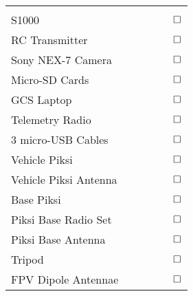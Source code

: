 \documentclass[12pt]{article}
\begin{document}
\begin{longtable}{|>{\raggedright}m{3cm}| m{2cm}| m{2cm}| m{2cm}|m{2cm}|c}
		\multicolumn{6}{c}{ }\\ \cline{1-1}
		S1000                                                                                      & \multicolumn{4}{c}{ }  & $\huge \square$ \\   \cline{1-1}
		RC Transmitter                                                                             & \multicolumn{4}{c}{ }  & $\huge \square$ \\   \cline{1-1}
		Sony NEX-7 Camera                                                                          & \multicolumn{4}{c}{ } & $\huge \square$ \\   \cline{1-1}
		Micro-SD Cards                                                                             & \multicolumn{4}{c}{ } & $\huge \square$ \\   \cline{1-1}
		GCS Laptop                                                                                 &\multicolumn{4}{c}{ } & $\huge \square$ \\   \cline{1-1}
		Telemetry Radio                                                                            & \multicolumn{4}{c}{ } & $\huge \square$ \\   \cline{1-1}
		3 micro-USB Cables                                                                         &\multicolumn{4}{c}{ }  & $\huge \square$ \\   \cline{1-1}
		Vehicle Piksi                                                                              & \multicolumn{4}{c}{ } & $\huge \square$ \\   \cline{1-1}
		Vehicle Piksi Antenna                                                                      &\multicolumn{4}{c}{ } & $\huge \square$ \\   \cline{1-1}
		Base Piksi                                                                                 & \multicolumn{4}{c}{ }  & $\huge \square$ \\   \cline{1-1}
		Piksi Base Radio Set                                                                       & \multicolumn{4}{c}{ } & $\huge \square$ \\   \cline{1-1}
		Piksi Base Antenna                                                                         & \multicolumn{4}{c}{ }  & $\huge \square$ \\   \cline{1-1}
		Tripod                                                                                     & \multicolumn{4}{c}{ }  & $\huge \square$ \\   \cline{1-1}
		FPV Dipole Antennae                                                                        & \multicolumn{4}{c}{ }  & $\huge \square$ \\   \cline{1-1}

\end{longtable}
\end{document}
